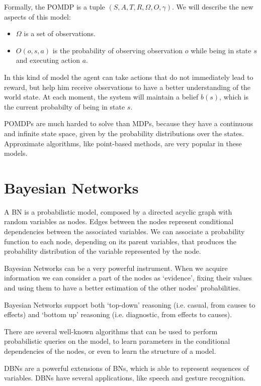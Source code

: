 Formally, the POMDP is a tuple $(S,A,T,R,\Omega,O,\gamma)$. We will describe the new aspects of this model:
\begin{itemize}
\item $\Omega$ is a set of observations.
\item $O(o,s,a)$ is the probability of observing observation $o$ while being in state $s$ and executing action $a$.
\end{itemize}

In this kind of model the agent can take actions that do not immediately lead to reward, but help him receive observations to have a better understanding of the world state. At each moment, the system will maintain a belief $b(s)$, which is the current probabilty of being in state $s$.

POMDPs are much harded to solve than MDPs, because they have a continuous and infinite state space, given by the probability distributions over the states. Approximate algorithms, like point-based methods, are very popular in these models.

\section{Bayesian Networks}
\label{sec:methods-bayesian_networks}

 A BN is a probabilistic model, composed by a directed acyclic graph with random variables as nodes. Edges between the nodes represent conditional dependencies between the associated variables. We can associate a probability function to each node, depending on its parent variables, that produces the probability distribution of the variable represented by the node. 

 Bayesian Networks can be a very powerful instrument. When we acquire information we can consider a part of the nodes as `evidence', fixing their values and using them to have a better estimation of the other nodes' probabilities. 

 Bayesian Networks support both `top-down' reasoning (i.e. casual, from causes to effects) and `bottom up' reasoning (i.e. diagnostic, from effects to causes).

There are several well-known algorithms that can be used to perform probabilistic queries on the model, to learn parameters in the conditional dependencies of the nodes, or even to learn the structure of a model.

DBNs are a powerful extensions of BNs, which is able to represent sequences of variables. DBNs have several applications, like speech and gesture recognition.
